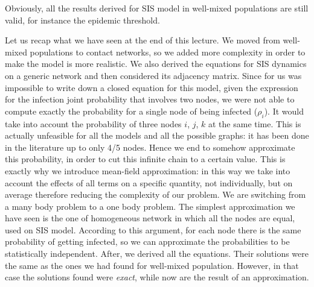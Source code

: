 \documentclass[../main/main.tex]{subfiles}
\begin{document}
Obviously, all the results derived for SIS model in well-mixed populations are still valid, for instance the epidemic threshold.

\begin{remark}
Let us recap what we have seen at the end of this lecture.
We moved from well-mixed populations to contact networks, so we added more complexity in order to make the model is more realistic. We also derived the equations for SIS dynamics on a generic network and then considered its adjacency matrix. Since for us was impossible to write down a closed equation for this model, given the expression for the infection joint probability that involves two nodes, we were not able to compute exactly the probability for a single node of being infected ($\rho_i$). It would take into account the probability of three nodes $i$, $j$, $k$ at the same time. This is actually unfeasible for all the models and all the possible graphs: it has been done in the literature up to only 4/5 nodes. Hence we end to somehow approximate this probability, in order to cut this infinite chain to a certain value. This is exactly why we introduce mean-field approximation: in this way we take into account the effects of all terms on a specific quantity, not individually, but on average therefore reducing the complexity of our problem. We are switching from a many body problem to a one body problem.
The simplest approximation we have seen is the one of homogeneous network in which all the nodes are equal, used on SIS model. According to this argument, for each node there is the same probability of getting infected, so we can approximate the probabilities to be statistically independent. After, we derived all the equations. Their solutions were the same as the ones we had found for well-mixed population. However, in that case the solutions found were \textit{exact}, while now are the result of an approximation.
\end{remark}
\end{document}
